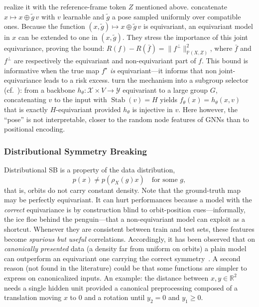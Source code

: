 \documentclass[mathematics,review,submit,moreauthors]{Definitions/mdpi}
\begin{document}
\citet{vadgama2025} realize it with the reference-frame token $Z$ mentioned above.
\citet{lawrence2024} concatenate $x\mapsto x\oplus\tilde g\,v$ with $v$ learnable and $\tilde g$ a pose sampled uniformly over compatible ones.
Because the function $(x,\tilde g)\mapsto x\oplus\tilde g\,v$ is equivariant, an equivariant model in $x$ can be extended to one in $(x,\tilde g)$.
They stress the importance of this joint equivariance, proving the bound: $R(f)-R(\bar f) = \|f^{\perp}\|_{\mathbb{P}(X,Z)}^{2}$, where $\bar f$ and $f^\perp$ are respectively the equivariant and non-equivariant part of $f$.
This bound is informative when the true map $f^\star$ \emph{is} equivariant---it informs that non joint-equivariance leads to a risk excess.
\citet{goel2025} turn the mechanism into a subgroup selector (cf.\ ): from a backbone $h_\theta:\mathcal{X}\times V\to\mathcal{Y}$ equivariant to a large group $G$, concatenating $v$ to the input with $\operatorname{Stab}(v)=H$ yields $f_\theta(x)=h_\theta(x,v)$ that is exactly $H$-equivariant provided $h_\theta$ is injective in $v$.
Here however, the ``pose'' is not interpretable, closer to the random node features of GNNs than to positional encoding.

\subsubsection{Distributional Symmetry Breaking}
Distributional SB is a property of the data distribution,
$$p(x)\neq p(\rho_X(g)x)\quad\text{for some }g,$$
that is, orbits do not carry constant density.
Note that the ground-truth map may be perfectly equivariant.
It can hurt performances because a model with the \emph{correct} equivariance is by construction blind to orbit-position cues---informally, the ice floe behind the penguin---that a non-equivariant model can exploit as a shortcut.
Whenever they are consistent between train and test sets, these features become \emph{spurious but useful} correlations.
Accordingly, it has been observed that on \emph{canonically presented} data (a density far from uniform on orbits) a plain model can outperform an equivariant one carrying the correct symmetry~\citep{lawrence2026,rygiel2026}.
A second reason (not found in the literature) could be that some functions are simpler to express on canonicalized inputs.
An example: the distance between $x,y\in\mathbb{R}^2$ needs a single hidden unit provided a canonical preprocessing composed of a translation moving $x$ to $0$ and a rotation until $y_2=0$ and $y_1\geq 0$.
\end{document}
